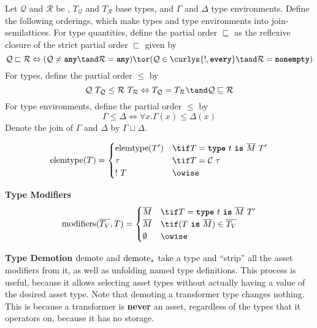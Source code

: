 \documentclass[10pt]{article}
\begin{document}
\begin{definition}
    Let $\mathcal{Q}$ and $\mathcal{R}$ be \typeQuantities, $T_\mathcal{Q}$ and $T_\mathcal{R}$ base types, and $\Gamma$ and $\Delta$ type environments.
    Define the following orderings, which make types and type environments into join-semilattices.
    For type quantities, define the partial order $\sqsubseteq$ as the reflexive closure of the strict partial order $\sqsubset$ given by
    \[
        \mathcal{Q} \sqsubset \mathcal{R} \iff (\mathcal{Q} \neq \any \tand \mathcal{R} = \any) \tor (\mathcal{Q} \in \curlys{\exactlyone, \every} \tand \mathcal{R} = \nonempty)
    \]
    For types, define the partial order $\leq$ by
    \[
        \mathcal{Q}~T_\mathcal{Q} \leq \mathcal{R}~T_\mathcal{R} \iff T_\mathcal{Q} = T_\mathcal{R} \tand \mathcal{Q} \sqsubseteq \mathcal{R}
    \]
    For type environments, define the partial order $\leq$ by
    \[
        \Gamma \leq \Delta \iff \forall x. \Gamma(x) \leq \Delta(x)
    \]
    Denote the join of $\Gamma$ and $\Delta$ by $\Gamma \sqcup \Delta$.
\end{definition}

\begin{align*}
    \elemtype(T) =
    \begin{cases}
        \elemtype(T') & \tif T = \type~t~\is~\overline{M}~T' \\
        \tau & \tif T = \mathcal{C}~\tau \\
        !~T & \owise
    \end{cases}
\end{align*}

 \textbf{Type Modifiers}
\begin{align*}
    \modifiers(\overline{T_V}, T) =
    \begin{cases}
        \overline{M} & \tif T = \type~t~\is~\overline{M}~T' \\
        \overline{M} & \tif (T~\is~\overline{M}) \in \overline{T_V} \\
        \emptyset & \owise
    \end{cases}
\end{align*}

\framebox{$\demoteT(\tau) = \sigma$}
 \textbf{Type Demotion}
$\text{demote}$ and $\text{demote}_*$ take a type and ``strip'' all the asset modifiers from it, as well as unfolding named type definitions.
This process is useful, because it allows selecting asset types without actually having a value of the desired asset type.
Note that demoting a transformer type changes nothing.
This is because a transformer is \textbf{never} an asset, regardless of the types that it operators on, because it has no storage.
\end{document}
